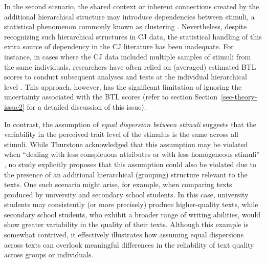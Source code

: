 \documentclass[
  authoryear,
  preprint,
  1p]{elsarticle}
\begin{document}
In the second scenario, the shared context or inherent connections
created by the additional hierarchical structure may introduce
dependencies between stimuli, a statistical phenomenon commonly known as
clustering \citep{Everitt_et_al_2010}. Nevertheless, despite recognizing
such hierarchical structures in CJ data, the statistical handling of
this extra source of dependency in the CJ literature has been
inadequate. For instance, in cases where the CJ data included multiple
samples of stimuli from the same individuals, researchers have often
relied on (averaged) estimated BTL scores to conduct subsequent analyses
and tests at the individual hierarchical level
\citep{Bramley_et_al_2019, Boonen_et_al_2020, Bouwer_et_al_2023, vanDaal_et_al_2017, Jones_et_al_2019, Gijsen_et_al_2021}.
This approach, however, has the significant limitation of ignoring the
uncertainty associated with the BTL scores (refer to section
Section~\ref{sec-theory-issue2} for a detailed discussion of this
issue).

In contrast, the assumption of \emph{equal dispersion between stimuli}
suggests that the variability in the perceived trait level of the
stimulus is the same across all stimuli. While Thurstone acknowledged
that this assumption may be violated when ``dealing with less
conspicuous attributes or with less homogeneous stimuli''
\citep[pp.~374]{Thurstone_1927a}, no study explicitly proposes that this
assumption could also be violated due to the presence of an additional
hierarchical (grouping) structure relevant to the texts. One such
scenario might arise, for example, when comparing texts produced by
university and secondary school students. In this case, university
students may consistently (or more precisely) produce higher-quality
texts, while secondary school students, who exhibit a broader range of
writing abilities, would show greater variability in the quality of
their texts. Although this example is somewhat contrived, it effectively
illustrates how assuming equal dispersions across texts can overlook
meaningful differences in the reliability of text quality across groups
or individuals.
\end{document}
